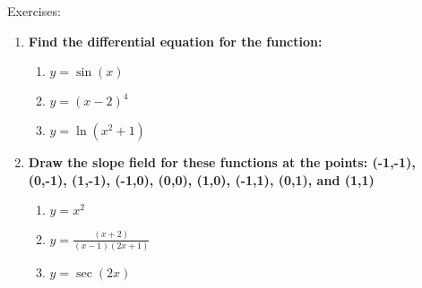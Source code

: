 \documentclass[../revisedmain.tex]{subfiles}
\begin{document}
\begin{center}
	\LARGE Exercises:
\end{center}
\begin{enumerate}
	\item \textbf{Find the differential equation for the function:}
	\begin{enumerate}
		\item $y=\sin(x)$
		\item $y=(x-2)^4$
		\item $y=\ln(x^2+1)$
	\end{enumerate}
	\item \textbf{Draw the slope field for these functions at the points: (-1,-1), (0,-1), (1,-1), (-1,0), (0,0), (1,0), (-1,1), (0,1), and (1,1)}
	\begin{enumerate}
		\item $y=x^2$
		\item $y=\displaystyle\frac{(x+2)}{(x-1)(2x+1)}$
		\item $y=\sec(2x)$
	\end{enumerate}
\end{enumerate}
\end{document}
